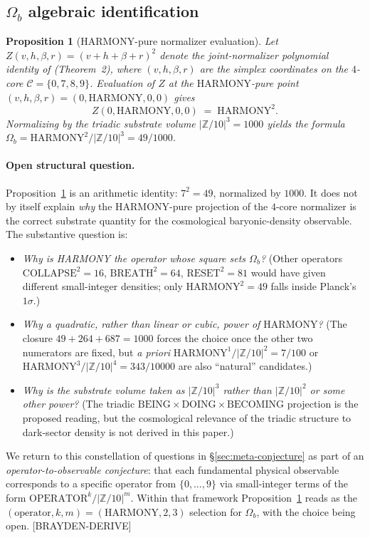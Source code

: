 \documentclass[11pt,reqno]{amsart}
\theoremstyle{plain}
\newtheorem{proposition}[theorem]{Proposition}
\theoremstyle{definition}
\theoremstyle{remark}
\newcommand{\Z}{\mathbb{Z}}
\begin{document}
\subsection{$\Omega_b$ algebraic identification}

\begin{proposition}[$\mathrm{HARMONY}$-pure normalizer evaluation]\label{prop:omega-b-deriv}
Let $Z(v, h, \beta, r) = (v + h + \beta + r)^{2}$ denote the
joint-normalizer polynomial identity of
\cite{SandersGish2026FourCore} (Theorem~2), where
$(v, h, \beta, r)$ are the simplex coordinates on the $4$-core
$\mathcal{C} = \{0, 7, 8, 9\}$. Evaluation of $Z$ at the
$\mathrm{HARMONY}$-pure point
$(v, h, \beta, r) = (0, \mathrm{HARMONY}, 0, 0)$ gives
\[
  Z(0, \mathrm{HARMONY}, 0, 0) \;=\; \mathrm{HARMONY}^{2}.
\]
Normalizing by the triadic substrate volume $|\Z/10|^{3} = 1000$
yields the formula $\Omega_b = \mathrm{HARMONY}^{2}/|\Z/10|^{3} = 49/1000$.
\end{proposition}

\paragraph{Open structural question.}
Proposition~\ref{prop:omega-b-deriv} is an arithmetic identity:
$7^{2} = 49$, normalized by $1000$. It does not by itself explain
\emph{why} the $\mathrm{HARMONY}$-pure projection of the $4$-core
normalizer is the correct substrate quantity for the cosmological
baryonic-density observable. The substantive question is:
\begin{itemize}
\item \emph{Why is HARMONY the operator whose square sets
$\Omega_b$?} (Other operators $\mathrm{COLLAPSE}^{2} = 16$,
$\mathrm{BREATH}^{2} = 64$, $\mathrm{RESET}^{2} = 81$ would
have given different small-integer densities; only
$\mathrm{HARMONY}^{2} = 49$ falls inside Planck's $1\sigma$.)
\item \emph{Why a quadratic, rather than linear or cubic, power
of $\mathrm{HARMONY}$?} (The closure $49 + 264 + 687 = 1000$
forces the choice once the other two numerators are fixed,
but \emph{a priori} $\mathrm{HARMONY}^{1}/|\Z/10|^{2} = 7/100$
or $\mathrm{HARMONY}^{3}/|\Z/10|^{4} = 343/10000$ are also
``natural'' candidates.)
\item \emph{Why is the substrate volume taken as $|\Z/10|^{3}$
rather than $|\Z/10|^{2}$ or some other power?}
(The triadic
$\mathrm{BEING} \times \mathrm{DOING} \times \mathrm{BECOMING}$
projection is the proposed reading, but the cosmological
relevance of the triadic structure to dark-sector density is
not derived in this paper.)
\end{itemize}
We return to this constellation of questions in
\S\ref{sec:meta-conjecture} as part of an
\emph{operator-to-observable conjecture}: that each fundamental
physical observable corresponds to a specific operator from
$\{0, \dots, 9\}$ via small-integer terms of the form
$\mathrm{OPERATOR}^{k}/|\Z/10|^{m}$. Within that framework
Proposition~\ref{prop:omega-b-deriv} reads as the
$(\mathrm{operator}, k, m) = (\mathrm{HARMONY}, 2, 3)$
selection for $\Omega_b$, with the choice being open. \mbox{[BRAYDEN-DERIVE]}
\end{document}
